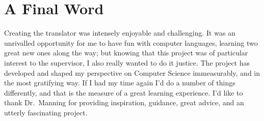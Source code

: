 \section{A Final Word}

Creating the translator was intensely enjoyable and challenging. It was an
unrivalled opportunity for me to have fun with computer languages, learning two
great new ones along the way; but knowing that this project was of particular
interest to the supervisor, I also really wanted to do it justice. The project
has developed and shaped my perspective on Computer Science immeasurably, and in
the most gratifying way. If I had my time again I'd do a number of things
differently, and that is the measure of a great learning experience. I'd like to
thank Dr.\ Manning for providing inspiration, guidance, great advice, and an
utterly fascinating project.
